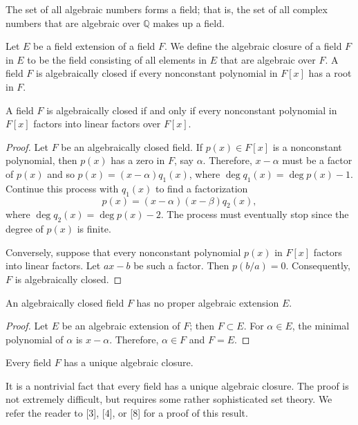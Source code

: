  
\begin{corollary}
The set of all algebraic numbers forms a field; that is, the set of all
complex numbers that are algebraic over ${\mathbb Q}$ makes up a field.
\end{corollary}
 

Let $E$ be a field extension of a field $F$. We define the {\bfi
algebraic closure\/}  of a field $F$ in $E$ to
be the field consisting of all elements in $E$ that are algebraic over
$F$. A field $F$ is {\bfi algebraically
closed\/} if every nonconstant
polynomial in  $F[x]$ has a root in $F$. 

 
\begin{theorem}
A field $F$ is algebraically closed if and only if every nonconstant
polynomial in $F[x]$ factors into linear factors over $F[x]$.
\end{theorem}
 
 
\begin{proof}
Let $F$ be an algebraically closed field. If $p(x) \in F[x]$ is a
nonconstant polynomial, then $p(x)$ has a zero in $F$, say $\alpha$.
Therefore, $x-\alpha$ must be a factor of $p(x)$ and so $p(x) = (x-
\alpha) q_1(x)$, where $\deg q_1(x) = \deg p(x) - 1$. Continue this
process with $q_1(x)$ to find a factorization
\[
p(x)=(x-\alpha)(x-\beta)q_2(x),
\]
where $\deg q_2(x) = \deg p(x) -2$. The process must eventually stop
since the degree of $p(x)$ is finite.  
 

Conversely, suppose that every nonconstant polynomial $p(x)$ in $F[x]$ 
factors into linear factors. Let $ax-b$ be such a factor.
Then $p( b/a) = 0$. Consequently, $F$ is algebraically closed.
\end{proof}
 
 
\begin{corollary}
An algebraically closed field $F$ has no proper algebraic extension
$E$. 
\end{corollary}
 

\begin{proof}
Let $E$ be an algebraic extension of $F$; then $F \subset E$. For $\alpha
\in E$, the minimal polynomial of $\alpha$ is $x - \alpha$. Therefore, 
$\alpha \in F$ and $F=E$. 
\end{proof}


\begin{theorem}
Every field $F$ has a unique algebraic closure.
\end{theorem}


It is a nontrivial fact that every field has a unique algebraic
closure. The proof is not extremely difficult, but requires some rather
sophisticated set theory. We refer the reader to [3], [4], or [8] for
a proof of this result.   %



